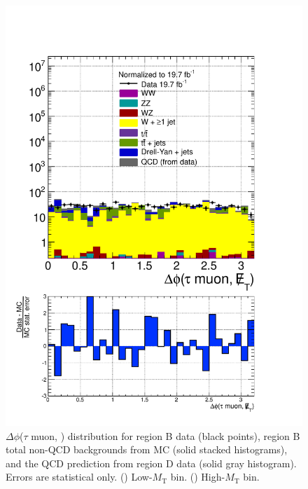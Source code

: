 \begin{figure}[hbtp]
\begin{center}
    \includegraphics[width=\cmsFigWidth]{figures/dataVsMCQCD_dPhiTauMuMET_highMT_v87}
    \caption{$\Delta\phi$($\tau$ muon, \ETslash) distribution for region B data (black points), region B total non-QCD backgrounds from MC (solid stacked histograms), and the QCD prediction from region D data (solid gray histogram).  Errors are statistical only. (\cmsLeft) Low-$M_{\text{T}}$ bin. (\cmsRight) High-$M_{\text{T}}$ bin.}
    \label{fig:regB-data-MC-dPhiTauMuMET}
  \end{center}
\end{figure}

